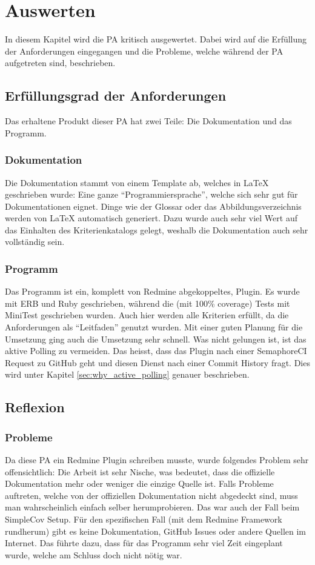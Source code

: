 \chapter{Auswerten}
In diesem Kapitel wird die PA kritisch ausgewertet. Dabei wird auf die Erfüllung der Anforderungen eingegangen
und die Probleme, welche während der PA aufgetreten sind, beschrieben.

\section{Erfüllungsgrad der Anforderungen}
Das erhaltene Produkt dieser PA hat zwei Teile: Die Dokumentation und das Programm.
\subsection{Dokumentation}
Die Dokumentation stammt von einem Template \cite{Buhler_ipa-template_2022} ab, welches in LaTeX geschrieben
wurde: Eine ganze \enquote{Programmiersprache}, welche sich sehr gut für Dokumentationen eignet. Dinge wie der
Glossar oder das Abbildungsverzeichnis werden von LaTeX automatisch generiert. \newline
Dazu wurde auch sehr viel Wert auf das Einhalten des Kriterienkatalogs gelegt, weshalb die Dokumentation auch
sehr vollständig sein.
\subsection{Programm}
Das Programm ist ein, komplett von Redmine abgekoppeltes, Plugin. Es wurde mit ERB und Ruby geschrieben, während
die (mit 100\% coverage) Tests mit MiniTest geschrieben wurden. Auch hier werden alle Kriterien erfüllt, da die
Anforderungen als \enquote{Leitfaden} genutzt wurden. Mit einer guten Planung für die Umsetzung ging auch die
Umsetzung sehr schnell. \newline
Was nicht gelungen ist, ist das aktive Polling zu vermeiden. Das heisst, dass das Plugin nach einer SemaphoreCI
Request zu GitHub geht und diesen Dienst nach einer Commit History fragt. Dies wird unter Kapitel
\ref{sec:why_active_polling} genauer beschrieben.

\section{Reflexion}
\subsection{Probleme}
Da diese PA ein Redmine Plugin schreiben musste, wurde folgendes Problem sehr offensichtlich: Die Arbeit ist
sehr Nische, was bedeutet, dass die offizielle Dokumentation \cite{redmine_plugin_tutorial} mehr oder weniger
die einzige Quelle ist. Falls Probleme auftreten, welche von der offiziellen Dokumentation nicht
abgedeckt sind, muss man wahrscheinlich einfach selber herumprobieren. Das war auch der Fall beim SimpleCov
Setup. Für den spezifischen Fall (mit dem Redmine Framework rundherum) gibt es keine Dokumentation, GitHub
Issues oder andere Quellen im Internet. \newline
Das führte dazu, dass für das Programm sehr viel Zeit eingeplant wurde, welche am Schluss doch nicht nötig war.
